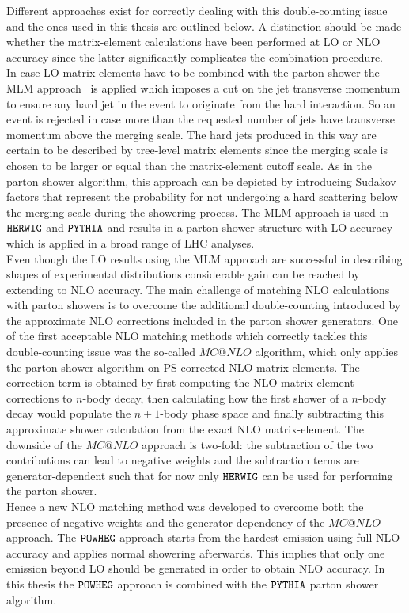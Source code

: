 Different approaches exist for correctly dealing with this double-counting issue and the ones used in this thesis are outlined below. A distinction should be made whether the matrix-element calculations have been performed at LO or NLO accuracy since the latter significantly complicates the combination procedure.\\
In case LO matrix-elements have to be combined with the parton shower the MLM approach~\cite{MLM} is applied which imposes a cut on the jet transverse momentum to ensure any hard jet in the event to originate from the hard interaction. So an event is rejected in case more than the requested number of jets have transverse momentum above the merging scale. The hard jets produced in this way are certain to be described by tree-level matrix elements since the merging scale is chosen to be larger or equal than the matrix-element cutoff scale.
As in the parton shower algorithm, this approach can be depicted by introducing Sudakov factors that represent the probability for not undergoing a hard scattering below the merging scale during the showering process.
The MLM approach is used in $\texttt{HERWIG}$ and $\texttt{PYTHIA}$ and results in a parton shower structure with LO accuracy which is applied in a broad range of LHC analyses.
\\
Even though the LO results using the MLM approach are successful in describing shapes of experimental distributions considerable gain can be reached by extending to NLO accuracy. 
The main challenge of matching NLO calculations with parton showers is to overcome the additional double-counting introduced by the approximate NLO corrections included in the parton shower generators. 
One of the first acceptable NLO matching methods which correctly tackles this double-counting issue was the so-called $MC@NLO$ algorithm, which only applies the parton-shower algorithm on PS-corrected NLO matrix-elements.
The correction term is obtained by first computing the NLO matrix-element corrections to $n$-body decay, then calculating how the first shower of a $n$-body decay would populate the $n+1$-body phase space and finally subtracting this approximate shower calculation from the exact NLO matrix-element. The downside of the $MC@NLO$ approach is two-fold: the subtraction of the two contributions can lead to negative weights and the subtraction terms are generator-dependent such that for now only $\texttt{HERWIG}$ can be used for performing the parton shower. 
\\
Hence a new NLO matching method was developed to overcome both the presence of negative weights and the generator-dependency of the $MC@NLO$ approach. The $\texttt{POWHEG}$ approach starts from the hardest emission using full NLO accuracy and applies normal showering afterwards. This implies that only one emission beyond LO should be generated in order to obtain NLO accuracy. In this thesis the $\texttt{POWHEG}$ approach is combined with the $\texttt{PYTHIA}$ parton shower algorithm.

